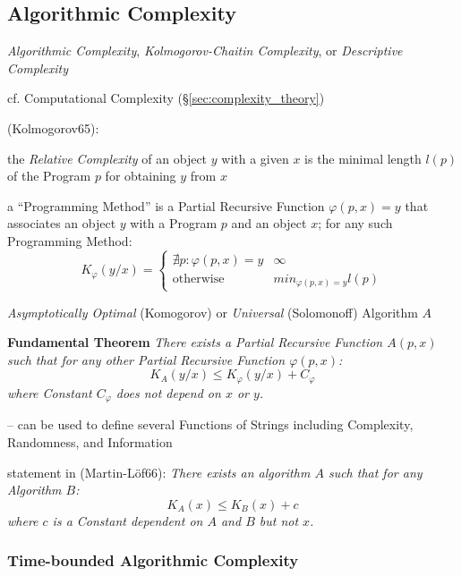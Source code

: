 \subsection{Algorithmic Complexity}\label{sec:algorithmic_complexity}

\emph{Algorithmic Complexity}, \emph{Kolmogorov-Chaitin Complexity}, or
\emph{Descriptive Complexity}

cf. Computational Complexity (\S\ref{sec:complexity_theory})

(Kolmogorov65):

the \emph{Relative Complexity} of an object $y$ with a given $x$
is the minimal length $l(p)$ of the Program $p$ for obtaining $y$ from $x$

a ``Programming Method'' is a Partial Recursive Function $\varphi(p, x) = y$
that associates an object $y$ with a Program $p$ and an object $x$; for any such
Programming Method:
\[
  K_\varphi(y/x) =
  \begin{cases}
    \nexists p : \varphi(p,x) = y & \infty \\
    \text{otherwise}              & min_{\varphi(p, x)=y} l(p)
  \end{cases}
\]

\emph{Asymptotically Optimal} (Komogorov) or \emph{Universal} (Solomonoff)
Algorithm $A$

\textbf{Fundamental Theorem} \emph{
  There exists a Partial Recursive Function $A(p, x)$ such that for any other
  Partial Recursive Function $\varphi(p, x)$:
  \[
    K_A(y/x) \leq K_\varphi(y/x) + C_\varphi
  \]
  where Constant $C_\varphi$ does not depend on $x$ or $y$.
}

-- can be used to define several Functions of Strings including Complexity,
Randomness, and Information

statement in (Martin-L\"of66):
\emph{
  There exists an algorithm $A$ such that for any Algorithm $B$:
  \[
    K_A(x) \leq K_B(x) + c
  \]
  where $c$ is a Constant dependent on $A$ and $B$ but not $x$.
}



\subsubsection{Time-bounded Algorithmic Complexity}
\label{sec:time_bounded_complexity}



